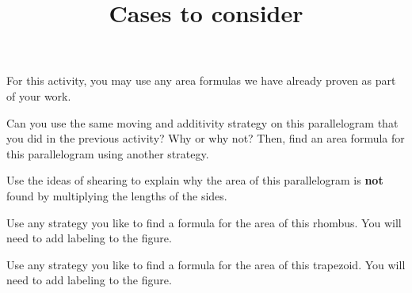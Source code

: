 \documentclass[nooutcomes,noauthor, handout]{ximera}
\title{Cases to consider}
\begin{document}
\begin{abstract}
\end{abstract}

\maketitle

For this activity, you may use any area formulas we have already proven as part of your work.

\begin{problem}
Can you use the same moving and additivity strategy on this parallelogram that you did in the previous activity? Why or why not? Then, find an area formula for this parallelogram using another strategy.

\begin{image}
\end{image}
\end{problem} \vfill

\begin{problem}
Use the ideas of shearing to explain why the area of this parallelogram is {\bf not} found by multiplying the lengths of the sides.

\begin{image}
\end{image}
\end{problem} \vfill

\newpage
\begin{problem}
Use any strategy you like to find a formula for the area of this rhombus. You will need to add labeling to the figure.

\begin{image}
\end{image}
\end{problem} \vfill


\begin{problem}
Use any strategy you like to find a formula for the area of this trapezoid. You will need to add labeling to the figure.

\begin{image}
\end{image}
\end{problem} \vfill
\end{document}
